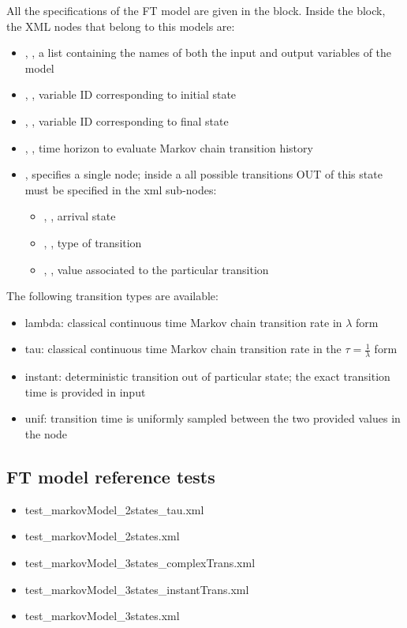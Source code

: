 All the specifications of the FT model are given in the 
 block. 
Inside the  block, the XML
nodes that belong to this models are:
\begin{itemize}
  \item  {}, , a list containing the names of both the input and output variables of the model
  \item  {}, , variable ID corresponding to initial state
  \item  {}, , variable ID corresponding to final state
  \item  {}, , time horizon to evaluate Markov chain transition history
  \item  {}, specifies a single node; inside a  all possible transitions OUT of this state must be specified
                          in the  xml sub-nodes:
	  \begin{itemize}
	  	\item {}, , arrival state
	    \item {}, , type of transition
	    \item {}, , value associated to the particular transition
	  \end{itemize}
\end{itemize}

The following transition types are available:
\begin{itemize}
  \item lambda: classical continuous time Markov chain transition rate in $\lambda$ form
  \item tau: classical continuous time Markov chain transition rate in the $\tau = \frac{1}{\lambda}$ form
  \item instant: deterministic transition out of particular state; the exact transition time is provided in input
  \item unif: transition time is uniformly sampled between the two provided values in the  node
\end{itemize}

\subsection{FT model reference tests}
\begin{itemize}
	\item test\_markovModel\_2states\_tau.xml
	\item test\_markovModel\_2states.xml
	\item test\_markovModel\_3states\_complexTrans.xml
	\item test\_markovModel\_3states\_instantTrans.xml
	\item test\_markovModel\_3states.xml
\end{itemize}